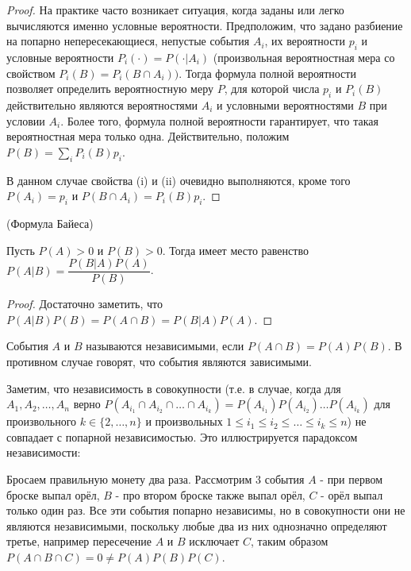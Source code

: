 \documentclass[a4paper]{article}
\begin{document}
\begin{colloq}
\begin{proof}
   		
   		На практике часто возникает ситуация, когда заданы или легко вычисляются именно	условные вероятности. Предположим, что задано разбиение на попарно непересекающиеся, непустые события $A_i$, их вероятности $p_i$ и условные вероятности $P_i(\cdot) = P(\cdot|A_i)$ (произвольная вероятностная мера со свойством $P_i(B) = P_i(B \cap A_i))$. Тогда формула полной вероятности позволяет определить вероятностную меру $P$, для которой числа $p_i$ и $P_i(B)$ действительно являются вероятностями $A_i$ и условными вероятностями $B$ при условии $A_i$. Более того, формула полной вероятности гарантирует, что такая вероятностная	мера только одна.
   		Действительно, положим $P(B) = \sum_i P_i(B)p_i$.
   		
   		В данном случае свойства (i) и (ii) очевидно выполняются, кроме того $P(A_i) = p_i$ и $P(B \cap A_i) = P_i(B)p_i$.
   	\end{proof}
   
	\begin{theorem*} (Формула Байеса)
		
		Пусть $P(A) > 0$ и $P(B) > 0$. Тогда имеет место равенство $P(A|B) = \dfrac{P(B|A)P(A)}{P(B)}$.
	\end{theorem*}

	\begin{proof}
		Достаточно заметить, что $P(A|B)P(B) = P(A \cap B) = P(B|A)P(A)$.
	\end{proof}

	\begin{definition*}
		События $A$ и $B$ называются независимыми, если $P(A \cap B) = P(A)P(B)$. В противном случае говорят, что события являются зависимыми.
	\end{definition*}

	Заметим, что независимость в совокупности (т.е. в случае, когда для $A_1, A_2, \dots, A_n$ верно $P(A_{i_1} \cap A_{i_2} \cap \dots \cap A_{i_k}) = P(A_{i_1})P(A_{i_2}) \dots P(A_{i_k})$ для произвольного $k \in \{2, \dots, n\}$ и произвольных $1 \leqslant i_1 \leqslant i_2 \leqslant \dots \leqslant i_k \leqslant n$) не совпадает с попарной независимостью. Это иллюстрируется парадоксом независимости:
	
	Бросаем правильную монету два раза. Рассмотрим 3 события $A$ - при первом броске выпал орёл, $B$ - про втором броске также выпал орёл, $C$ - орёл выпал только один раз. Все эти события попарно независимы, но в совокупности они не являются независимыми, поскольку любые два из них однозначно определяют третье, например пересечение $A$ и $B$ исключает $C$, таким образом $P(A \cap B \cap C) = 0 \neq P(A)P(B)P(C)$.
	

\end{colloq}
\end{document}
